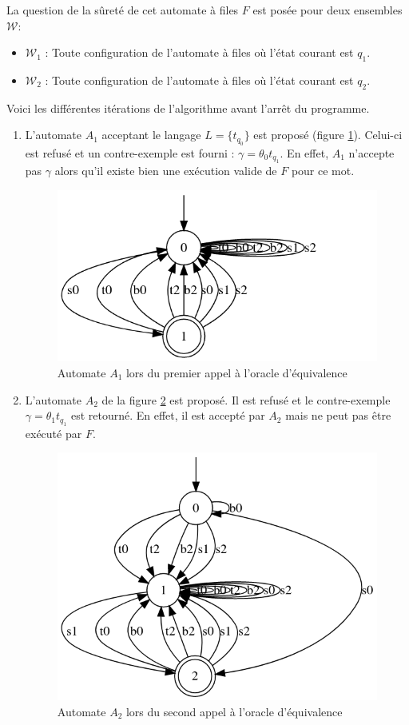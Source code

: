 La question de la sûreté de cet automate à files $F$ est posée pour deux ensembles $\mathcal{W}$:

\begin{itemize}
  \item $\mathcal{W}_1$ : Toute configuration de l'automate à files où l'état courant est $q_1$.
  \item $\mathcal{W}_2$ : Toute configuration de l'automate à files où l'état courant est $q_2$.
\end{itemize}

Voici les différentes itérations de l'algorithme avant l'arrêt du programme.

\begin{enumerate}

\item L'automate $A_1$ acceptant le langage $L=\{t_{q_0}\}$ est proposé (figure \ref{fig:fina1}). Celui-ci est refusé et un contre-exemple est fourni : $\gamma=\theta_0 t_{q_1}$. En effet, $A_1$ n'accepte pas $\gamma$ alors qu'il existe bien une exécution valide de $F$ pour ce mot.

\begin{figure}[H]
  \centering
  \includegraphics[width=0.4\linewidth]{res/minimalist_0}
  \caption{Automate $A_1$ lors du premier appel à l'oracle d'équivalence}\label{fig:fina1}
\end{figure}

\item L'automate $A_2$ de la figure \ref{fig:fina2} est proposé. Il est refusé et le contre-exemple $\gamma=\theta_1 t_{q_1}$ est retourné. En effet, il est accepté par $A_2$ mais ne peut pas être exécuté par $F$.
\begin{figure}[H]
  \centering
  \includegraphics[width=0.4\linewidth]{res/minimalist_1}
  \caption{Automate $A_2$ lors du second appel à l'oracle d'équivalence}\label{fig:fina2}
\end{figure}


\end{enumerate}
